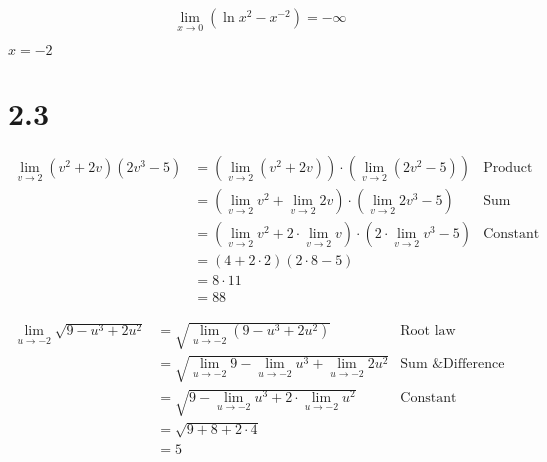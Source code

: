 \documentclass{../../classes/anal}
\begin{document}
    \begin{problem}{39}
        \begin{equation*}
            \lim_{x\rightarrow0}(\ln x^2 - x^{-2}) = -\infty
        \end{equation*}
    \end{problem}

    \begin{problem}{41}
        \(x=-2\)
    \end{problem}

    \section*{2.3}

    \begin{problem}{5}
        \begin{align*}
            \lim_{v\rightarrow2}(v^2+2v)(2v^3-5)
            &= (\lim_{v\rightarrow2}(v^2+2v))\cdot(\lim_{v\rightarrow2}(2v^2-5)) & \text{Product law} \\
            &= (\lim_{v\rightarrow2}v^2+\lim_{v\rightarrow2}2v)\cdot(\lim_{v\rightarrow2}2v^3-5) & \text{Sum \& Difference law} \\
            &= (\lim_{v\rightarrow2}v^2 + 2\cdot\lim_{v\rightarrow2}v)\cdot(2\cdot\lim_{v\rightarrow2}v^3-5) & \text{Constant multiple law} \\
            &= (4+2\cdot2)(2\cdot8-5) & \\
            &= 8\cdot11 & \\
            &= 88&
        \end{align*}
    \end{problem}

    \begin{problem}{7}
        \begin{align*}
            \lim_{u\rightarrow-2}\sqrt{9-u^3+2u^2}
            &= \sqrt{\lim_{u\rightarrow-2}(9-u^3+2u^2)} & \text{Root law} \\
            &= \sqrt{\lim_{u\rightarrow-2}9-\lim_{u\rightarrow-2}u^3+\lim_{u\rightarrow-2}2u^2} & \text{Sum \& Difference laws} \\
            &= \sqrt{9 - \lim_{u\rightarrow-2}u^3 + 2\cdot\lim_{u\rightarrow-2}u^2} & \text{Constant Multiple law} \\
            &= \sqrt{9+8+2\cdot4} \\
            &= 5
        \end{align*}
    \end{problem}
\end{document}
